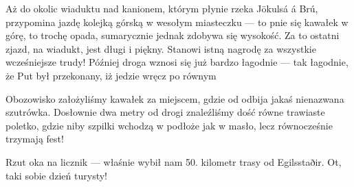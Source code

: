 
Aż do okolic wiaduktu nad kanionem, którym płynie rzeka Jökulsá á Brú,  przypomina jazdę kolejką górską w wesołym miasteczku --- to pnie się kawałek w górę, to trochę opada, sumarycznie jednak zdobywa się wysokość. Za to ostatni zjazd, na wiadukt, jest długi i piękny. Stanowi istną nagrodę za wszystkie wcześniejsze trudy! Później droga wznosi się już bardzo łagodnie --- tak łagodnie, że Put był przekonany, iż jedzie wręcz po równym \wink

Obozowisko założyliśmy kawałek za miejscem, gdzie od  odbija jakaś nienazwana szutrówka. Dosłownie dwa metry od drogi znaleźliśmy dość równe trawiaste poletko, gdzie niby szpilki wchodzą w podłoże jak w masło, lecz równocześnie trzymają fest!

Rzut oka na licznik --- właśnie wybił nam 50. kilometr trasy od Egilsstaðir. Ot, taki sobie dzień turysty!
